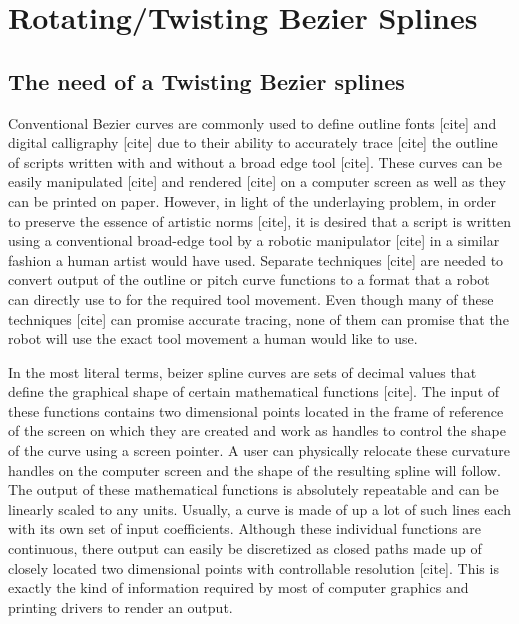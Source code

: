 \section{Rotating/Twisting Bezier Splines}
\label{Chapter:SplineModelling}

    \subsection{The need of a Twisting Bezier splines}

    Conventional Bezier curves are commonly used to define outline fonts [cite] and digital calligraphy [cite] due to their ability to accurately trace [cite] the outline of scripts written with and without a broad edge tool [cite]. These curves can be easily manipulated [cite] and rendered [cite] on a computer screen as well as they can be printed on paper. However, in light of the underlaying problem, in order to preserve the essence of artistic norms [cite], it is desired that a script is written using a conventional broad-edge tool by a robotic manipulator [cite] in a similar fashion a human artist would have used. Separate techniques [cite] are needed to convert output of the outline or pitch curve functions to a format that a robot can directly use to for the required tool movement. Even though many of these techniques [cite] can promise accurate tracing, none of them can promise that the robot will use the exact tool movement a human would like to use.

    In the most literal terms, beizer spline curves are sets of decimal values that define the graphical shape of certain mathematical functions [cite]. The input of these functions contains two dimensional points located in the frame of reference of the screen on which they are created and work as handles to control the shape of the curve using a screen pointer. A user can physically relocate these curvature handles on the computer screen and the shape of the resulting spline will follow. The output of these mathematical functions is absolutely repeatable and can be linearly scaled to any units. Usually, a curve is made of up a lot of such lines each with its own set of input coefficients. Although these individual functions are continuous, there output can easily be discretized as closed paths made up of closely located two dimensional points with controllable resolution [cite]. This is exactly the kind of information required by most of computer graphics and printing drivers to render an output.

